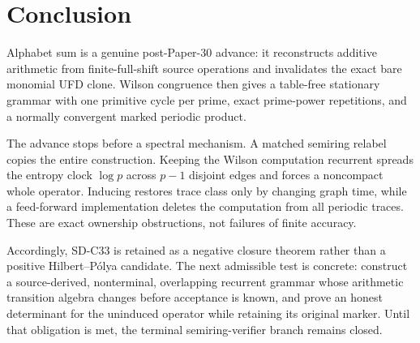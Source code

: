 \section{Conclusion}
\label{sec:conclusion}

Alphabet sum is a genuine post-Paper-30 advance: it reconstructs additive
arithmetic from finite-full-shift source operations and invalidates the exact
bare monomial UFD clone.  Wilson congruence then gives a table-free stationary
grammar with one primitive cycle per prime, exact prime-power repetitions,
and a normally convergent marked periodic product.

The advance stops before a spectral mechanism.  A matched semiring relabel
copies the entire construction.  Keeping the Wilson computation recurrent
spreads the entropy clock $\log p$ across $p-1$ disjoint edges and forces a
noncompact whole operator.  Inducing restores trace class only by changing
graph time, while a feed-forward implementation deletes the computation from
all periodic traces.  These are exact ownership obstructions, not failures of
finite accuracy.

Accordingly, SD-C33 is retained as a negative closure theorem rather than a
positive Hilbert--P\'olya candidate.  The next admissible test is concrete:
construct a source-derived, nonterminal, overlapping recurrent grammar whose
arithmetic transition algebra changes before acceptance is known, and prove
an honest determinant for the uninduced operator while retaining its original
marker.  Until that obligation is met, the terminal semiring-verifier branch
remains closed.
